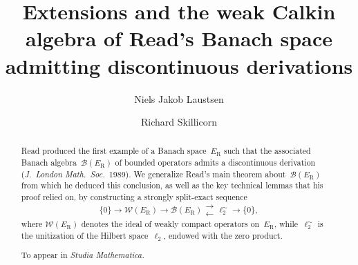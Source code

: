 \documentclass[12pt,reqno]{amsart}
\theoremstyle{definition}
\numberwithin{equation}{section}
\begin{document}
\title[Extensions and the weak Calkin algebra of Read's Banach
  space]{Extensions and the weak Calkin algebra of Read's Banach space
  admitting discontinuous derivations}
%
%
\author[N.~J.~Laustsen]{Niels Jakob Laustsen} \address{Department of
  Mathematics and Statistics, Fylde College, Lancaster University,
  Lancaster LA1 4YF, United Kingdom}
%
\author[R.~Skillicorn]{Richard Skillicorn} \address{Department of
  Mathematics and Statistics, Fylde College, Lancaster University,
  Lancaster LA1 4YF, United Kingdom}
%
%
\begin{abstract} 
Read produced the first example of a Banach space~$E_{\text{R}}$ such
that the associated Banach algebra~$\mathscr{B}(E_{\text{R}})$ of
bounded operators admits a discontinuous derivation (\emph{J.~Lon\-don
  Math.\ Soc.}~1989).  We generalize Read's main theorem
about~$\mathscr{B}(E_{\text{R}})$ from which he deduced this
conclusion, as well as the key technical lemmas that his proof relied
on, by constructing a strongly split-exact sequence
\[ \{0\}\longrightarrow\mathscr{W}(E_{\text{R}})%
\longrightarrow\mathscr{B}(E_{\text{R}})%
   \mathrel{\substack{{\displaystyle{\longrightarrow}}\\[-.5ex]%
       {\displaystyle{\longleftarrow}}}}
   \ell_2^\sim\longrightarrow\{0\}, \] 
where $\mathscr{W}(E_{\text{R}})$ denotes the ideal of weakly compact
operators on~$E_{\text{R}}$, while~$\ell_2^\sim$ is the unitization of 
the Hilbert space~$\ell_2$, endowed with the zero product.\bigskip

\noindent%
To appear in \emph{Studia Mathematica.} 
\end{abstract}
%
\maketitle
%
\end{document}

